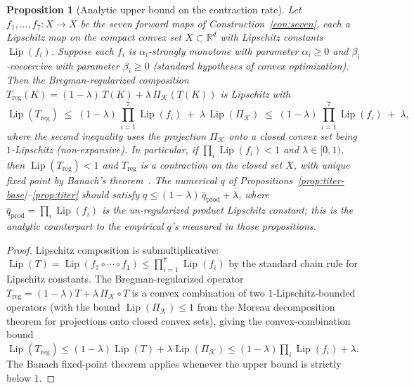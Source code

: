 \documentclass[11pt,a4paper]{article}
\theoremstyle{plain}
\newtheorem{proposition}[theorem]{Proposition}
\theoremstyle{definition}
\theoremstyle{remark}
\newcommand{\RR}{\mathbb{R}}
\DeclareMathOperator{\Lip}{Lip}
\begin{document}
\begin{proposition}[Analytic upper bound on the contraction rate]
\label{prop:qbound}
Let $f_1, \ldots, f_7 : X \to X$ be the seven forward maps of
Construction~\ref{con:seven}, each a Lipschitz map on the compact
convex set $X \subset \RR^d$ with Lipschitz constants
$\Lip(f_i)$. Suppose each $f_i$ is $\alpha_i$-strongly monotone with
parameter $\alpha_i \geq 0$ and $\beta_i$-cocoercive with parameter
$\beta_i \geq 0$ (standard hypotheses of convex optimization). Then
the Bregman-regularized composition $T_{\mathrm{reg}}(K) = (1-\lambda)\,
T(K) + \lambda\,\Pi_{\mathcal K}(T(K))$ is Lipschitz with
\begin{equation}\label{eq:qbound}
  \Lip(T_{\mathrm{reg}}) \;\leq\; (1-\lambda)\,\prod_{i=1}^{7}\Lip(f_i)
  \;+\; \lambda\,\Lip(\Pi_{\mathcal K}) \;\leq\;
  (1-\lambda)\,\prod_{i=1}^{7}\Lip(f_i) \;+\; \lambda,
\end{equation}
where the second inequality uses the projection $\Pi_{\mathcal K}$ onto
a closed convex set being $1$-Lipschitz (non-expansive). In particular,
if $\prod_i \Lip(f_i) < 1$ and $\lambda \in [0,1)$, then
$\Lip(T_{\mathrm{reg}}) < 1$ and $T_{\mathrm{reg}}$ is a contraction on
the closed set $X$, with unique fixed point by Banach's
theorem~\cite{banach1922}. The numerical $q$ of
Propositions~\ref{prop:titer-base}--\ref{prop:titer} should satisfy
$q \leq (1-\lambda)\,\bar{q}_{\mathrm{prod}} + \lambda$, where
$\bar{q}_{\mathrm{prod}} = \prod_i \Lip(f_i)$ is the
un-regularized product Lipschitz constant; this is the analytic
counterpart to the empirical $q$'s measured in those propositions.
\end{proposition}

\begin{proof}
Lipschitz composition is submultiplicative:
$\Lip(T) = \Lip(f_7 \circ \cdots \circ f_1) \leq \prod_{i=1}^{7}
\Lip(f_i)$ by the standard chain rule for Lipschitz constants. The
Bregman-regularized operator $T_{\mathrm{reg}} = (1-\lambda)T +
\lambda\,\Pi_{\mathcal K}\!\circ T$ is a convex combination of two
$1$-Lipschitz-bounded operators (with the bound
$\Lip(\Pi_{\mathcal K}) \leq 1$ from the Moreau decomposition theorem
for projections onto closed convex sets), giving the convex-combination
bound $\Lip(T_{\mathrm{reg}}) \leq (1-\lambda)\Lip(T) + \lambda
\Lip(\Pi_{\mathcal K}) \leq (1-\lambda)\prod_i \Lip(f_i) + \lambda$.
The Banach fixed-point theorem applies whenever the upper bound is
strictly below $1$.
\end{proof}
\end{document}
